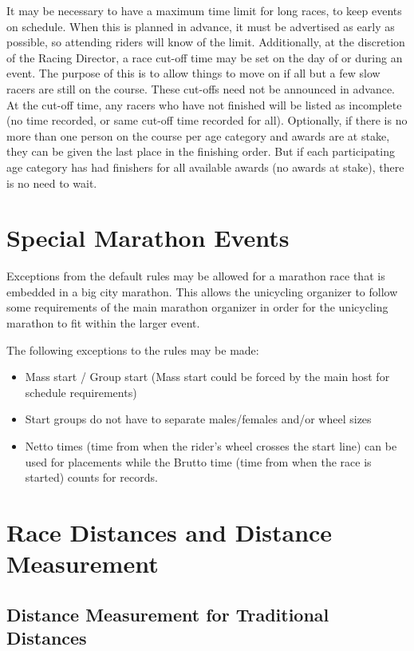 It may be necessary to have a maximum time limit for long races, to keep events on schedule.
When this is planned in advance, it must be advertised as early as possible, so attending riders will know of the limit.
Additionally, at the discretion of the Racing Director, a race cut-off time may be set on the day of or during an event.
The purpose of this is to allow things to move on if all but a few slow racers are still on the course.
These cut-offs need not be announced in advance.
At the cut-off time, any racers who have not finished will be listed as incomplete (no time recorded, or same cut-off time recorded for all).
Optionally, if there is no more than one person on the course per age category and awards are at stake, they can be given the last place in the finishing order.
But if each participating age category has had finishers for all available awards (no awards at stake), there is no need to wait.

\section{Special Marathon Events}

Exceptions from the default rules may be allowed for a marathon race that is embedded in a big city marathon.%
This allows the unicycling organizer to follow some requirements of the main marathon organizer in order for the unicycling marathon to fit within the larger event.

The following exceptions to the rules may be made:
\begin{itemize}
\item Mass start / Group start (Mass start could be forced by the main host for schedule requirements) 
\item Start groups do not have to separate males/females and/or wheel sizes
\item Netto times (time from when the rider's wheel crosses the start line) can be used for placements while the Brutto time (time from when the race is started) counts for records.
\end{itemize}

\section{Race Distances and Distance Measurement}

\subsection {Distance Measurement for Traditional Distances}

